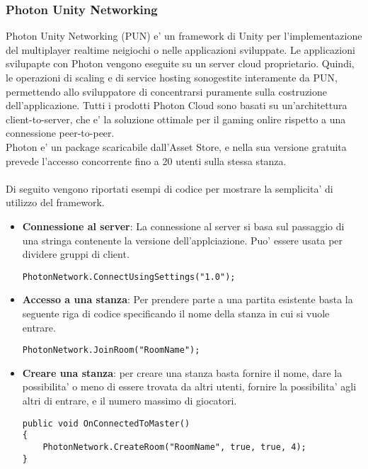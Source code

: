 \subsubsection{Photon Unity Networking}
Photon Unity Networking (PUN) e' un framework di Unity per l'implementazione del multiplayer realtime neigiochi o nelle applicazioni sviluppate. Le applicazioni svilupapte con Photon vengono eseguite su un server cloud proprietario. Quindi, le operazioni di scaling e di service hosting sonogestite interamente da PUN, permettendo allo sviluppatore di concentrarsi puramente sulla costruzione dell'applicazione. Tutti i prodotti Photon Cloud sono basati su un'architettura client-to-server, che e' la soluzione ottimale per il gaming onlire rispetto a una connessione peer-to-peer.\\
Photon e' un package scaricabile dall'Asset Store, e nella sua versione gratuita prevede l'accesso concorrente fino a 20 utenti sulla stessa stanza. \\\\
Di seguito vengono riportati esempi di codice per mostrare la semplicita' di utilizzo del framework.\\
\begin{itemize}
	\item \textbf{Connessione al server}: La connessione al server si basa sul passaggio di una stringa contenente la versione dell'applciazione. Puo' essere usata per dividere gruppi di client.
\begin{lstlisting}
PhotonNetwork.ConnectUsingSettings("1.0");
\end{lstlisting}

	\item \textbf{Accesso a una stanza}: Per prendere parte a una partita esistente basta la seguente riga di codice specificando il nome della stanza in cui si vuole entrare.
\begin{lstlisting}
PhotonNetwork.JoinRoom("RoomName");
\end{lstlisting}

	\item \textbf{Creare una stanza}: per creare una stanza basta fornire il nome, dare la possibilita' o meno di essere trovata da altri utenti, fornire la possibilita' agli altri di entrare, e il numero massimo di giocatori.
\begin{lstlisting}
public void OnConnectedToMaster()
{
	PhotonNetwork.CreateRoom("RoomName", true, true, 4);
}

\end{lstlisting}	
	
\end{itemize}

